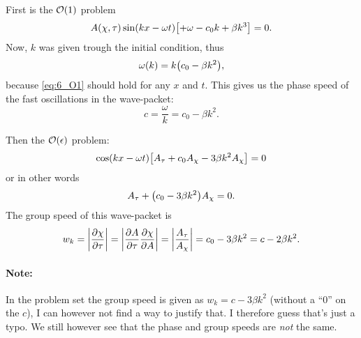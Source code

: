 \documentclass[11pt,letter, swedish, english
]{article}
\begin{document}
First is the $\order{1}$ problem
\begin{equation}\label{eq:6_O1}
A(\chi,\tau)\sin(kx-\omega{t})
\qty[+\omega-c_0k+\beta k^3]=0.
\end{equation}
Now, $k$ was given trough the initial condition, thus
\begin{equation}
\omega(k)=k\qty(c_0-\beta k^2),
\end{equation}
because \eqref{eq:6_O1} should hold for any $x$ and $t$. This gives us
the phase speed of the fast oscillations in the wave-packet:
\begin{equation}
c=\frac{\omega}{k}=c_0-\beta k^2.
\end{equation}

Then the $\order{\epsilon}$ problem:
\begin{equation}
\cos(kx-\omega t)
\qty[A_\tau+c_0 A_\chi-3\beta k^2A_\chi]=0
\end{equation}
or in other words
\begin{equation}
A_\tau+\qty(c_0 -3\beta k^2)A_\chi=0.
\end{equation}
The group speed of this wave-packet is
\begin{equation}
w_k=\abs{\pdv{\chi}{\tau}}=\abs{\pdv{A}{\tau}\pdv{\chi}{A}}
=\abs{\frac{A_\tau}{A_\chi}}
=c_0 -3\beta k^2=c-2\beta k^2.
\end{equation}

\paragraph{Note: }
In the problem set the group speed is given as $w_k=c-3\beta k^2$
(without a ``0'' on the $c$), I can however not find a way to justify
that. I therefore guess that's just a typo. We still however see that
the phase and group speeds are \emph{not} the same.
\end{document}
